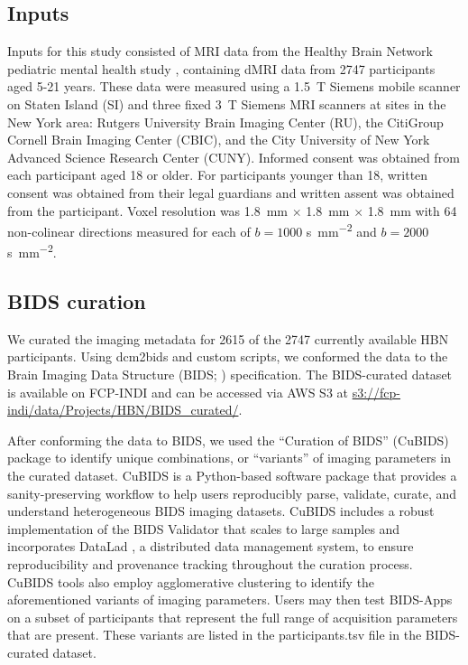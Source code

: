 \documentclass[9pt,lineno]{elife}
\begin{document}
\subsection{Inputs}

Inputs for this study consisted of MRI data from the Healthy Brain Network
pediatric mental health study \citep{alexander2017-yc}, containing dMRI data from
\num{2747} participants aged 5-21 years.
These data were measured using a \qty{1.5}{\tesla} Siemens mobile scanner on Staten Island (SI) and three fixed
\qty{3}{\tesla} Siemens MRI scanners at sites in the New York area: Rutgers
University Brain Imaging Center (RU), the CitiGroup Cornell Brain Imaging
Center (CBIC), and the City University of New York Advanced Science Research
Center (CUNY).
Informed consent was obtained from each participant aged 18 or
older. For participants younger than 18, written consent was obtained from their
legal guardians and written assent was obtained from the participant. Voxel
resolution was \qty{1.8}{\mm} $\times$ \qty{1.8}{\mm} $\times$ \qty{1.8}{\mm} with \num{64} non-colinear
directions measured for each of $b=1000$ \unit{\second \per \mm^{2}} and
$b=2000$ \unit{\second \per \mm^{2}}.

\subsection{BIDS curation}

We curated the imaging metadata for \num{2615} of the \num{2747} currently
available HBN participants. Using dcm2bids and custom scripts, we conformed the data
to the Brain Imaging Data Structure (BIDS; \citep{gorgolewski2016-lh})
specification. The BIDS-curated dataset is available on FCP-INDI and can be
accessed via AWS S3 at \url{s3://fcp-indi/data/Projects/HBN/BIDS_curated/}.

After conforming the data to BIDS, we used the ``Curation of BIDS'' (CuBIDS) package \citep{sydney-covitz2022-cubids} to identify unique combinations, or ``variants'' of imaging parameters in the curated dataset.
CuBIDS is a Python-based software package that provides a sanity-preserving workflow to help users reproducibly parse, validate, curate, and understand heterogeneous BIDS imaging datasets. CuBIDS includes a robust implementation of the BIDS Validator that scales to large samples and incorporates DataLad \citep{halchenko2021datalad}, a distributed data management system, to ensure reproducibility and provenance tracking throughout the curation process. CuBIDS tools also employ agglomerative clustering to identify the aforementioned variants of imaging parameters. Users may then test BIDS-Apps on a subset of participants that represent the full range of acquisition parameters that are present. These variants are listed in the participants.tsv file in the BIDS-curated dataset.
\end{document}
